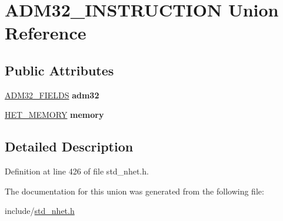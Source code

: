 \hypertarget{unionADM32__INSTRUCTION}{}\section{A\+D\+M32\+\_\+\+I\+N\+S\+T\+R\+U\+C\+T\+I\+ON Union Reference}
\label{unionADM32__INSTRUCTION}
\subsection*{Public Attributes}
\begin{DoxyCompactItemize}
\item 
\mbox{\label{unionADM32__INSTRUCTION_acd255bee58add30ab9376f2a2aac3d7f}} 
\mbox{\hyperlink{structADM32__format}{A\+D\+M32\+\_\+\+F\+I\+E\+L\+DS}} {\bfseries adm32}
\item 
\mbox{\label{unionADM32__INSTRUCTION_ac6faee60bf5e3973542bfba8d6aa5478}} 
\mbox{\hyperlink{structmemory__format}{H\+E\+T\+\_\+\+M\+E\+M\+O\+RY}} {\bfseries memory}
\end{DoxyCompactItemize}


\subsection{Detailed Description}


Definition at line 426 of file std\+\_\+nhet.\+h.



The documentation for this union was generated from the following file\+:\begin{DoxyCompactItemize}
\item 
include/\mbox{\hyperlink{std__nhet_8h}{std\+\_\+nhet.\+h}}\end{DoxyCompactItemize}
